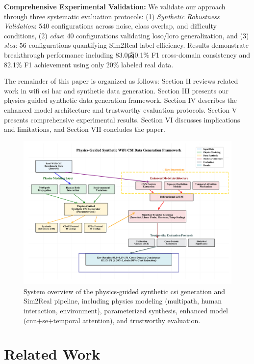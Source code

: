\documentclass[journal]{IEEEtran}
\begin{document}
\textbf{Comprehensive Experimental Validation:} We validate our approach through three systematic evaluation protocols: (1) \textit{Synthetic Robustness Validation}: 540 configurations across noise, class overlap, and difficulty conditions, (2) \textit{\gls{cdae}}: 40 configurations validating \gls{loso}/\gls{loro} generalization, and (3) \textit{\gls{stea}}: 56 configurations quantifying Sim2Real label efficiency. Results demonstrate breakthrough performance including 83.0卤0.1\% F1 cross-domain consistency and 82.1\% F1 achievement using only 20\% labeled real data.

The remainder of this paper is organized as follows: Section II reviews related work in \gls{wifi} \gls{csi} \gls{har} and synthetic data generation. Section III presents our physics-guided synthetic data generation framework. Section IV describes the enhanced model architecture and trustworthy evaluation protocols. Section V presents comprehensive experimental results. Section VI discusses implications and limitations, and Section VII concludes the paper.

\begin{figure}[t]
\centering
\includegraphics[width=\columnwidth]{figures/figure1_system overview.pdf}
\caption{System overview of the physics-guided synthetic \gls{csi} generation and Sim2Real pipeline, including physics modeling (multipath, human interaction, environment), parameterized synthesis, enhanced model (\gls{cnn}+\gls{se}+temporal attention), and trustworthy evaluation.}
\label{fig:system_overview}
\end{figure}

\section{Related Work}
\end{document}

